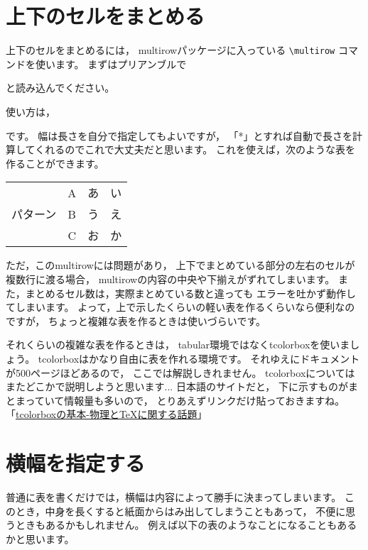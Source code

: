 \documentclass[class=jreport, crop=false, preview=false, dvipdfmx, fleqn]{standalone}
\begin{document}
\section{上下のセルをまとめる}
上下のセルをまとめるには，
multirowパッケージに入っている
\verb|\multirow| コマンドを使います。
まずはプリアンブルで
\begin{ITeX}
\usepackage{multirow}
\end{ITeX}
と読み込んでください。

使い方は，
\begin{ITeX}
\end{ITeX}
です。
幅は長さを自分で指定してもよいですが，
「*」とすれば自動で長さを計算してくれるのでこれで大丈夫だと思います。
これを使えば，次のような表を作ることができます。

\begin{IOTeX*}
\begin{tabular}{|c|c|cc|} \hline
\multirow{3}{*}{パターン} & A & あ & い \\ \cline{2-4}
& B & う & え \\ \cline{2-4}
& C & お & か \\ \hline
\end{tabular}
\end{IOTeX*}

ただ，このmultirowには問題があり，
上下でまとめている部分の左右のセルが複数行に渡る場合，
multirowの内容の中央や下揃えがずれてしまいます。
また，まとめるセル数は，実際まとめている数と違っても
エラーを吐かず動作してしまいます。
よって，上で示したくらいの軽い表を作るくらいなら便利なのですが，
ちょっと複雑な表を作るときは使いづらいです。

それくらいの複雑な表を作るときは，
tabular環境ではなくtcolorboxを使いましょう。
tcolorboxはかなり自由に表を作れる環境です。
それゆえにドキュメントが500ページほどあるので，
ここでは解説しきれません。
tcolorboxについてはまたどこかで説明しようと思います...
日本語のサイトだと，
下に示すものがまとまっていて情報量も多いので，
とりあえずリンクだけ貼っておきますね。\\
「\href{http://texmedicine.hatenadiary.jp/entry/2015/12/17/000339}{tcolorboxの基本-物理とTeXに関する話題}」



\section{横幅を指定する}
普通に表を書くだけでは，横幅は内容によって勝手に決まってしまいます。
このとき，中身を長くすると紙面からはみ出してしまうこともあって，
不便に思うときもあるかもしれません。
例えば以下の表のようなことになることもあるかと思います。
\end{document}
